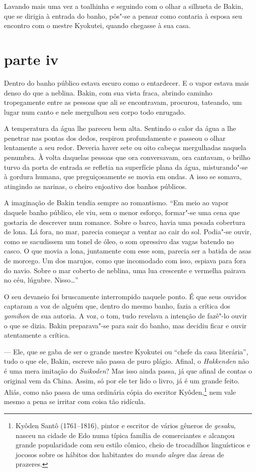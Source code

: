Lavando mais uma vez a toalhinha e seguindo com o olhar a silhueta de
Bakin, que se dirigia à entrada do banho, pôs"-se a pensar como contaria
à esposa seu encontro com o mestre Kyokutei, quando chegasse à sua casa.

\section*{parte iv}

Dentro do banho público estava escuro como o entardecer. E o vapor
estava mais denso do que a neblina. Bakin, com sua vista fraca, abrindo
caminho tropegamente entre as pessoas que ali se encontravam, procurou,
tateando, um lugar num canto e nele mergulhou seu corpo todo enrugado.

A temperatura da água lhe pareceu bem alta. Sentindo o calor da água a
lhe penetrar nas pontas dos dedos, respirou profundamente e passeou o
olhar lentamente a seu redor. Deveria haver sete ou oito cabeças
mergulhadas naquela penumbra. À volta daquelas pessoas que ora
conversavam, ora cantavam, o brilho turvo da porta de entrada se
refletia na superfície plana da água, misturando"-se à gordura humana,
que preguiçosamente se movia em ondas. A isso se somava, atingindo as
narinas, o cheiro enjoativo dos banhos públicos.

A imaginação de Bakin tendia sempre ao romantismo. ``Em meio ao vapor
daquele banho público, ele viu, sem o menor esforço, formar"-se uma cena
que gostaria de descrever num romance. Sobre o barco, havia uma pesada
cobertura de lona. Lá fora, no mar, parecia começar a ventar ao cair do
sol. Podia"-se ouvir, como se sacudissem um tonel de óleo, o som
opressivo das vagas batendo no casco. O que movia a lona, juntamente
com esse som, parecia ser a batida de asas de morcego. Um dos marujos,
como que incomodado com isso, espiava para fora do navio. Sobre o mar
coberto de neblina, uma lua crescente e vermelha pairava no céu,
lúgubre. Nisso\ldots{}''

O seu devaneio foi bruscamente interrompido naquele ponto. É que seus
ouvidos captaram a voz de alguém que, dentro do mesmo banho, fazia a
crítica dos \textit{yomihon} de sua autoria. A voz, o tom, tudo
revelava a intenção de fazê"-lo ouvir o que se dizia. Bakin preparava"-se
para sair do banho, mas decidiu ficar e ouvir atentamente a crítica.

--- Ele, que se gaba de ser o grande mestre Kyokutei ou ``chefe da casa
literária'', tudo o que ele, Bakin, escreve não passa de puro plágio.
Afinal, o \textit{Hakkenden} não é uma mera imitação do
\textit{Suikoden}? Mas isso ainda passa, já que afinal de contas o
original vem da China. Assim, só por ele ter lido o livro, já é um
grande feito. Aliás, como não passa de uma ordinária cópia do escritor
Kyôden,\footnote{ Kyôden Santô (1761--1816), pintor e escritor de vários 
gêneros de \textit{gesaku}, nasceu na cidade de Edo numa típica família de comerciantes 
e alcançou grande popularidade com seu estilo cômico, cheio de trocadilhos 
linguísticos e jocosos sobre os hábitos dos habitantes do \textit{mundo alegre} 
das áreas de prazeres.} nem vale mesmo a pena se irritar com coisa tão ridícula.

